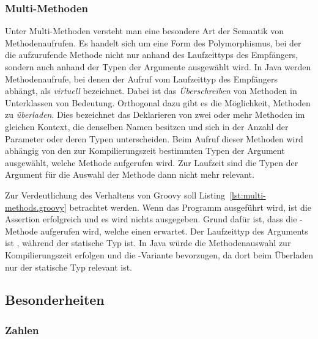 
	\subsubsection{Multi-Methoden}

	Unter Multi-Methoden versteht man eine besondere Art der Semantik von Methodenaufrufen.
	Es handelt sich um eine Form des Polymorphismus, bei der die aufzurufende Methode nicht nur anhand des Laufzeittyps des Empfängers, sondern auch anhand der Typen der Argumente ausgewählt wird.
	In Java werden Methodenaufrufe, bei denen der Aufruf vom Laufzeittyp des Empfängers abhängt, als \emph{virtuell} bezeichnet.
	Dabei ist das \emph{Überschreiben} von Methoden in Unterklassen von Bedeutung.
	Orthogonal dazu gibt es die Möglichkeit, Methoden zu \emph{überladen}.
	Dies bezeichnet das Deklarieren von zwei oder mehr Methoden im gleichen Kontext, die denselben Namen besitzen und sich in der Anzahl der Parameter oder deren Typen unterscheiden.
	Beim Aufruf dieser Methoden wird abhängig von den zur Kompilierungszeit bestimmten Typen der Argument ausgewählt, welche Methode aufgerufen wird.
	Zur Laufzeit sind die Typen der Argument für die Auswahl der Methode dann nicht mehr relevant.


	Zur Verdeutlichung des Verhaltens von Groovy soll Listing~\ref{lst:multi-methods.groovy} betrachtet werden.
	Wenn das Programm ausgeführt wird, ist die Assertion erfolgreich und es wird nichts ausgegeben.
	Grund dafür ist, dass die -Methode aufgerufen wird, welche einen  erwartet.
	Der Laufzeittyp des Arguments  ist , während der statische Typ  ist.
	In Java würde die Methodenauswahl zur Kompilierungszeit erfolgen und die -Variante bevorzugen, da dort beim Überladen nur der statische Typ relevant ist.

	\subsection{Besonderheiten}\label{subsec:besonderheiten}


	\subsubsection{Zahlen}\label{subsubsec:zahlen}

